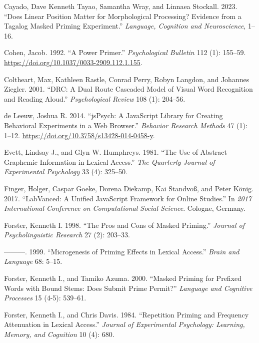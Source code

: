 \documentclass[
]{interact}
\newlength{\cslhangindent}
\newenvironment{CSLReferences}[2] %
 {\begin{list}{}{%
  \setlength{\itemindent}{0pt}
  \setlength{\leftmargin}{0pt}
  \setlength{\parsep}{0pt}
  \ifodd #1
   \setlength{\leftmargin}{\cslhangindent}
   \setlength{\itemindent}{-1\cslhangindent}
  \fi
  \setlength{\itemsep}{#2\baselineskip}}}
 {\end{list}}
\begin{document}
\begin{CSLReferences}{1}{0}
Cayado, Dave Kenneth Tayao, Samantha Wray, and Linnaea Stockall. 2023.
{``Does Linear Position Matter for Morphological Processing? Evidence
from a Tagalog Masked Priming Experiment.''} \emph{Language, Cognition
and Neuroscience}, 1--16.

Cohen, Jacob. 1992. {``A Power Primer.''} \emph{Psychological Bulletin}
112 (1): 155--59. \url{https://doi.org/10.1037/0033-2909.112.1.155}.

Coltheart, Max, Kathleen Rastle, Conrad Perry, Robyn Langdon, and
Johannes Ziegler. 2001. {``DRC: A Dual Route Cascaded Model of Visual
Word Recognition and Reading Aloud.''} \emph{Psychological Review} 108
(1): 204--56.

de Leeuw, Joshua R. 2014. {``jsPsych: A JavaScript Library for Creating
Behavioral Experiments in a Web Browser.''} \emph{Behavior Research
Methods} 47 (1): 1--12. \url{https://doi.org/10.3758/s13428-014-0458-y}.

Evett, Lindsay J., and Glyn W. Humphreys. 1981. {``The Use of Abstract
Graphemic Information in Lexical Access.''} \emph{The Quarterly Journal
of Experimental Psychology} 33 (4): 325--50.

Finger, Holger, Caspar Goeke, Dorena Diekamp, Kai Standvoß, and Peter
König. 2017. {``LabVanced: A Unified JavaScript Framework for Online
Studies.''} In \emph{2017 International Conference on Computational
Social Science}. Cologne, Germany.

Forster, Kenneth I. 1998. {``The Pros and Cons of Masked Priming.''}
\emph{Journal of Psycholinguistic Research} 27 (2): 203--33.

---------. 1999. {``Microgenesis of Priming Effects in Lexical
Access.''} \emph{Brain and Language} 68: 5--15.

Forster, Kenneth I., and Tamiko Azuma. 2000. {``Masked Priming for
Prefixed Words with Bound Stems: Does Submit Prime Permit?''}
\emph{Language and Cognitive Processes} 15 (4-5): 539--61.

Forster, Kenneth I., and Chris Davis. 1984. {``Repetition Priming and
Frequency Attenuation in Lexical Access.''} \emph{Journal of
Experimental Psychology: Learning, Memory, and Cognition} 10 (4): 680.


\end{CSLReferences}
\end{document}

